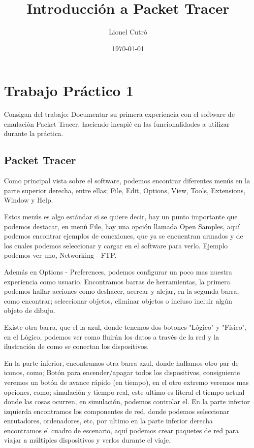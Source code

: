 \documentclass{article}
\title{\textbf{Introducción a Packet Tracer}}
\author{Lionel Cutró}
\date{\today}
\begin{document}
\maketitle

\section{Trabajo Práctico 1}
Consigan del trabajo:
Documentar su primera experiencia con el software de emulación Packet Tracer, haciendo incapié en las funcionalidades a utilizar durante la práctica.

\subsection{Packet Tracer}
Como principal vista sobre el software, podemos encontrar diferentes menús en la parte superior derecha, entre ellas; File, Edit, Options, View, Tools, Extensions, Window y Help.

Estos menús es algo estándar si se quiere decir, hay un punto importante que podemos destacar, en menú File, hay una opción llamada Open Samples, aquí podemos encontrar ejemplos de conexiones, que ya se encuentran armados y de los cuales podemos seleccionar y cargar en el software para verlo. Ejemplo podemos ver uno, Networking - FTP.

Además en Options - Preferences, podemos configurar un poco mas nuestra experiencia como usuario. Encontramos barras de herramientas, la primera podemos hallar acciones como deshacer, acercar y alejar, en la segunda barra, como encontrar; seleccionar objetos, eliminar objetos o incluso incluir algún objeto de dibujo.

Existe otra barra, que el la azul, donde tenemos dos botones "Lógico" y "Físico", en el Lógico, podemos ver como fluirán los datos a través de la red y la ilustración de como se conectan los dispositivos.

En la parte inferior, encontramos otra barra azul, donde hallamos otro par de iconos, como; Botón para encender/apagar todos los dispositivos, consiguiente veremos un botón de avance rápido (en tiempo), en el otro extremo veremos mas opciones, como; simulación y tiempo real, este ultimo es literal el tiempo actual donde las cosas ocurren, en simulación, podemos controlar el. En la parte inferior izquierda encontramos los componentes de red, donde podemos seleccionar enrutadores, ordenadores, etc, por ultimo en la parte inferior derecha encontramos el cuadro de escenario, aquí podemos crear paquetes de red para viajar a múltiples dispositivos y verlos durante el viaje.
\end{document}
